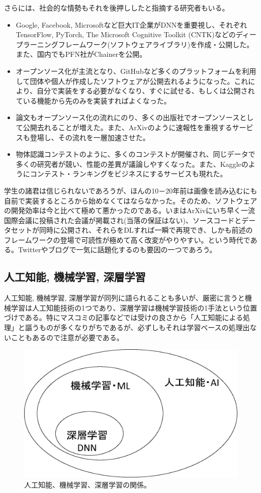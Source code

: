 さらには、社会的な情勢もそれを後押ししたと指摘する研究者もいる。
\begin{itemize}
\item Google, Facebook, Microsoftなど巨大IT企業がDNNを重要視し、それぞれTensorFlow, PyTorch, The Microsoft Cognitive Toolkit (CNTK)などのディープラーニングフレームワーク(ソフトウェアライブラリ)を作成・公開した。また、国内でもPFN社がChainerを公開。
\item オープンソース化が主流となり、GitHubなど多くのプラットフォームを利用して団体や個人が作成したソフトウェアが公開去れるようになった。これにより、自分で実装をする必要がなくなり、すぐに試せる、もしくは公開されている機能から先のみを実装すればよくなった。
\item 論文もオープンソース化の流れにのり、多くの出版社でオープンソースとして公開去れることが増えた。また、ArXivのように速報性を重視するサービスも登場し、その流れを一層加速させた。
\item 物体認識コンテストのように、多くのコンテストが開催され、同じデータで多くの研究者が競い、性能の差異が議論しやすくなった。また、Kaggleのようにコンテスト・ランキングをビジネスにするサービスも現れた。
\end{itemize}
学生の諸君は信じられないであろうが、ほんの10－20年前は画像を読み込むにも自前で実装するところから始めなくてはならなかった。そのため、ソフトウェアの開発効率は今と比べて極めて悪かったのである。いまはArXivにいち早く一流国際会議に投稿された会議が掲載され(当落の保証はない)、ソースコードとデータセットが同時に公開され、それらをDLすれば一瞬で再現でき、しかも前述のフレームワークの登場で可読性が極めて高く改変がやりやすい。という時代である。Twitterやブログで一気に話題化するのも要因の一つであろう。



\subsection{人工知能, 機械学習, 深層学習}
人工知能, 機械学習, 深層学習が同列に語られることも多いが、厳密に言うと機械学習は人工知能技術の1つであり、深層学習は機械学習技術の1手法という位置づけである。特にマスコミの記事などでは受けの良さから「人工知能による処理」と謳うものが多くなりがちであるが、必ずしもそれは学習ベースの処理出ないこともあるので注意が必要である。

\begin{figure}[ht]
	\begin{center}
		\includegraphics[width=0.7\linewidth] {images/YamasakiLab/introduction/AI_ML_DNN.eps}
		\caption{人工知能、機械学習、深層学習の関係。}
		\label{fig:accuracy}
	\end{center}
\end{figure}



